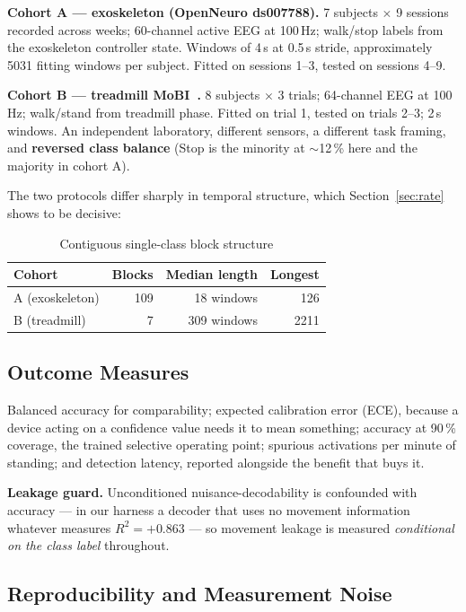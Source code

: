 \documentclass[conference]{IEEEtran}
\begin{document}
\textbf{Cohort A --- exoskeleton (OpenNeuro ds007788).} 7 subjects $\times$ 9
sessions recorded across weeks; 60-channel active EEG at 100\,Hz; walk/stop
labels from the exoskeleton controller state. Windows of 4\,s at 0.5\,s stride,
approximately 5031 fitting windows per subject. Fitted on sessions 1--3, tested
on sessions 4--9.

\textbf{Cohort B --- treadmill MoBI~\cite{luu}.} 8 subjects $\times$ 3 trials;
64-channel EEG at 100\,Hz; walk/stand from treadmill phase. Fitted on trial 1,
tested on trials 2--3; 2\,s windows. An independent laboratory, different
sensors, a different task framing, and \textbf{reversed class balance} (Stop is
the minority at $\sim$12\,\% here and the majority in cohort A).

The two protocols differ sharply in temporal structure, which
Section~\ref{sec:rate} shows to be decisive:

\begin{table}[htbp]
\caption{Contiguous single-class block structure}
\label{tab:blocks}
\centering
\begin{tabular}{lrrr}
\toprule
Cohort & Blocks & Median length & Longest \\
\midrule
A (exoskeleton) & 109 & 18 windows & 126 \\
B (treadmill)   & 7   & 309 windows & 2211 \\
\bottomrule
\end{tabular}
\end{table}

\subsection{Outcome Measures}

Balanced accuracy for comparability; expected calibration error (ECE), because a
device acting on a confidence value needs it to mean something; accuracy at
90\,\% coverage, the trained selective operating point; spurious activations per
minute of standing; and detection latency, reported alongside the benefit that
buys it.

\textbf{Leakage guard.} Unconditioned nuisance-decodability is confounded with
accuracy --- in our harness a decoder that uses no movement information whatever
measures $R^2 = +0.863$ --- so movement leakage is measured \emph{conditional on
the class label} throughout.

\subsection{Reproducibility and Measurement Noise}
\label{sec:noise}
\end{document}
